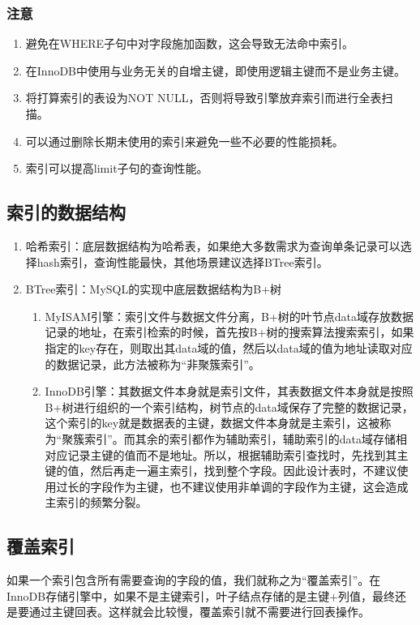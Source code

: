 \documentclass[a4paper]{report}
\begin{document}
\subsubsection{注意}
\begin{enumerate}
    \item 避免在WHERE子句中对字段施加函数，这会导致无法命中索引。
    \item 在InnoDB中使用与业务无关的自增主键，即使用逻辑主键而不是业务主键。
    \item 将打算索引的表设为NOT NULL，否则将导致引擎放弃索引而进行全表扫描。
    \item 可以通过删除长期未使用的索引来避免一些不必要的性能损耗。
    \item 索引可以提高limit子句的查询性能。
\end{enumerate}

\subsection{索引的数据结构}
\begin{enumerate}
    \item 哈希索引：底层数据结构为哈希表，如果绝大多数需求为查询单条记录可以选择hash索引，查询性能最快，其他场景建议选择BTree索引。
    \item BTree索引：MySQL的实现中底层数据结构为B+树
        \begin{enumerate}
            \item MyISAM引擎：索引文件与数据文件分离，B+树的叶节点data域存放数据记录的地址，在索引检索的时候，首先按B+树的搜索算法搜索索引，如果指定的key存在，则取出其data域的值，然后以data域的值为地址读取对应的数据记录，此方法被称为“非聚簇索引”。
            \item InnoDB引擎：其数据文件本身就是索引文件，其表数据文件本身就是按照B+树进行组织的一个索引结构，树节点的data域保存了完整的数据记录，这个索引的key就是数据表的主键，数据文件本身就是主索引，这被称为“聚簇索引”。而其余的索引都作为辅助索引，辅助索引的data域存储相对应记录主键的值而不是地址。所以，根据辅助索引查找时，先找到其主键的值，然后再走一遍主索引，找到整个字段。因此设计表时，不建议使用过长的字段作为主键，也不建议使用非单调的字段作为主键，这会造成主索引的频繁分裂。
        \end{enumerate}
\end{enumerate}

\subsection{覆盖索引}
如果一个索引包含所有需要查询的字段的值，我们就称之为“覆盖索引”。在InnoDB存储引擎中，如果不是主键索引，叶子结点存储的是主键+列值，最终还是要通过主键回表。这样就会比较慢，覆盖索引就不需要进行回表操作。
\end{document}
